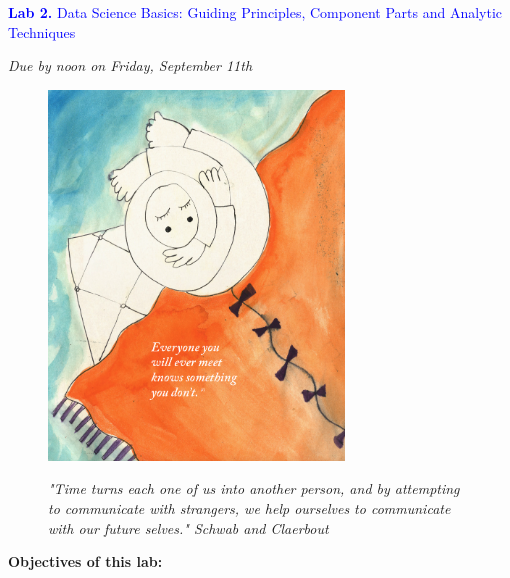 \documentclass{article}
\begin{document}
\vspace*{.01mm}

\begin{center}

\Large{\textcolor{blue}{\textbf{Lab 2.}  Data Science Basics: Guiding Principles, Component Parts and Analytic Techniques}}  \\ %

\vspace{4mm}

\textit{Due by noon on Friday, September 11th}\\

\end{center}

\begin{figure}[h!]
\begin{center}
\includegraphics[width=0.7\textwidth]{everyone.png}

\vspace{10mm}

\large{\textit{"Time turns each one of us into another person, and by attempting to communicate with strangers, we help ourselves to communicate with our future selves."  Schwab and Claerbout} } \\

\end{center}
\end{figure}


\newpage


\large{\textbf{Objectives of this lab:}}
\end{document}
